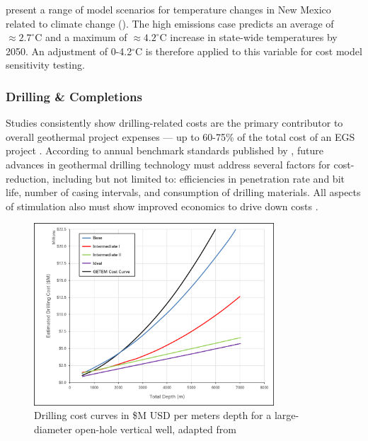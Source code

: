 \citeauthor{frankson_new_2019} present a range of model scenarios for temperature changes in New Mexico related to climate change (\citeyear[Figure 1]{frankson_new_2019}). The high emissions case predicts an average of $\approx 2.7^\circ$C and a maximum of $\approx 4.2^\circ$C increase in state-wide temperatures by 2050. An adjustment of 0-4.2$^\circ$C is therefore applied to this variable for cost model sensitivity testing.

\subsubsection{Drilling \& Completions}\label{ch4:drilling_uncertainty}
Studies consistently show drilling-related costs are the primary contributor to overall geothermal project expenses --- up to 60-75\% of the total cost of an EGS project \citep{lukawski_uncertainty_2016}. According to annual benchmark standards published by \citet{nrel_2020_2020}, future advances in geothermal drilling technology must address several factors for cost-reduction, including but not limited to: efficiencies in penetration rate and bit life, number of casing intervals, and consumption of drilling materials. All aspects of stimulation also must show improved economics to drive down costs \citep{nrel_2020_2020}.

\begin{figure}[!htp]
\centering
\includegraphics[width=0.8\textwidth]{templates/images/Figure-Drilling_Cost_Curves.png}
\singlespacing
\caption[GeoVision drilling cost curves]{Drilling cost curves in \$M USD per meters depth for a large-diameter open-hole vertical well, adapted from \citep[Figure 8]{augustine_geovision_2019}}
\label{fig:drill_cost_curves}
\end{figure}

